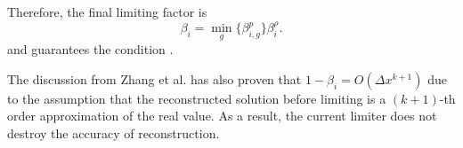 Therefore, the final limiting factor is
\begin{equation}
    \beta_i = \min_g\{\beta_{i,g}^p\}\beta_i^\rho.
\end{equation}
and guarantees the condition .

The discussion from Zhang et al. \cite{zhang2010positivity} has also proven
that $1-\beta_{i} = O(\Delta x^{k+1})$ due to the assumption that
the reconstructed solution before limiting
is a $(k+1)$-th order approximation of the real value.
As a result, the current limiter does not destroy the accuracy of reconstruction.










